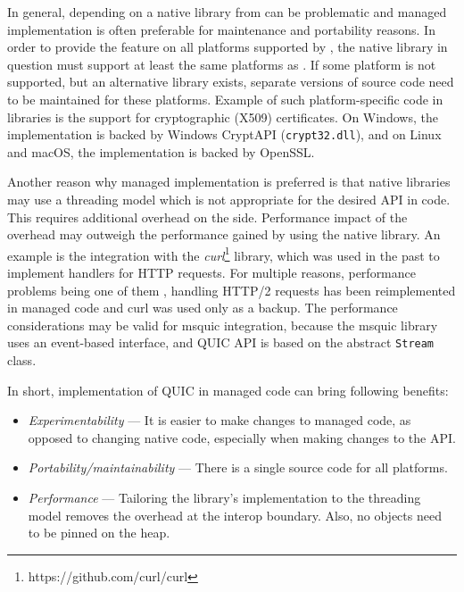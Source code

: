 In general, depending on a native library from \dotnet{} can be problematic and managed
implementation is often preferable for maintenance and portability reasons. In order to provide the
feature on all platforms supported by \dotnet{}, the native library in question must support at
least the same platforms as \dotnet{}. If some platform is not supported, but an alternative library
exists, separate versions of \dotnet{} source code need to be maintained for these platforms.
Example of such platform-specific code in \dotnet{} libraries is the support for cryptographic
(X509) certificates. On Windows, the implementation is backed by Windows CryptAPI (\texttt{crypt32.dll}), and
on Linux and macOS, the implementation is backed by OpenSSL\@. 




Another reason why managed implementation is preferred is that native libraries may use a threading
model which is not appropriate for the desired API in \dotnet{} code. This requires additional
overhead on the \dotnet{} side. Performance impact of the overhead may outweigh the performance
gained by using the native library.  An example is the
integration with the \textit{curl}\footnote{https://github.com/curl/curl} library, which was used
in the past to implement handlers for HTTP requests. For multiple reasons, performance problems
being one of them , handling HTTP/2 requests has been
reimplemented in managed code and curl was used only as a backup. The performance considerations may
be valid for msquic integration, because the msquic library uses an event-based interface, and
\dotnet{} QUIC API is based on the abstract \texttt{Stream} class.

In short, implementation of QUIC in managed \dotnet{} code can bring following benefits:

\begin{itemize}
  \item \textit{Experimentability} ---
    It is easier to make changes to managed code, as opposed to changing native code, especially
    when making changes to the API\@.

  \item \textit{Portability/maintainability} ---
    There is a single source code for all platforms.

  \item \textit{Performance} ---
    Tailoring the library's implementation to the \dotnet{} threading model removes the overhead at
    the interop boundary. Also, no objects need to be pinned on the heap.
\end{itemize}

